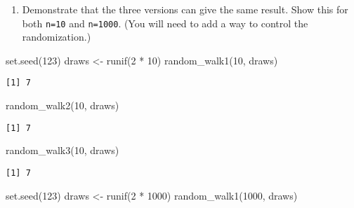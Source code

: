 \documentclass[
  letterpaper,
  DIV=11,
  numbers=noendperiod]{scrartcl}
\newenvironment{Shaded}{\begin{snugshade}}{\end{snugshade}}
\newcommand{\DecValTok}[1]{\textcolor[rgb]{0.68,0.00,0.00}{#1}}
\newcommand{\FunctionTok}[1]{\textcolor[rgb]{0.28,0.35,0.67}{#1}}
\newcommand{\NormalTok}[1]{\textcolor[rgb]{0.00,0.23,0.31}{#1}}
\newcommand{\OtherTok}[1]{\textcolor[rgb]{0.00,0.23,0.31}{#1}}
\newcommand{\SpecialCharTok}[1]{\textcolor[rgb]{0.37,0.37,0.37}{#1}}
\providecommand{\tightlist}{%
  \setlength{\itemsep}{0pt}\setlength{\parskip}{0pt}}
\begin{document}
\begin{enumerate}
\def\labelenumi{\arabic{enumi}.}
\setcounter{enumi}{1}
\tightlist
\item
  Demonstrate that the three versions can give the same result. Show
  this for both \texttt{n=10} and \texttt{n=1000}. (You will need to add
  a way to control the randomization.)\\
\end{enumerate}

\begin{Shaded}
\begin{Highlighting}[]
\FunctionTok{set.seed}\NormalTok{(}\DecValTok{123}\NormalTok{)}
\NormalTok{draws }\OtherTok{\textless{}{-}} \FunctionTok{runif}\NormalTok{(}\DecValTok{2} \SpecialCharTok{*} \DecValTok{10}\NormalTok{)}
\FunctionTok{random\_walk1}\NormalTok{(}\DecValTok{10}\NormalTok{, draws)}
\end{Highlighting}
\end{Shaded}

\begin{verbatim}
[1] 7
\end{verbatim}

\begin{Shaded}
\begin{Highlighting}[]
\FunctionTok{random\_walk2}\NormalTok{(}\DecValTok{10}\NormalTok{, draws)}
\end{Highlighting}
\end{Shaded}

\begin{verbatim}
[1] 7
\end{verbatim}

\begin{Shaded}
\begin{Highlighting}[]
\FunctionTok{random\_walk3}\NormalTok{(}\DecValTok{10}\NormalTok{, draws)}
\end{Highlighting}
\end{Shaded}

\begin{verbatim}
[1] 7
\end{verbatim}

\begin{Shaded}
\begin{Highlighting}[]
\FunctionTok{set.seed}\NormalTok{(}\DecValTok{123}\NormalTok{)}
\NormalTok{draws }\OtherTok{\textless{}{-}} \FunctionTok{runif}\NormalTok{(}\DecValTok{2} \SpecialCharTok{*} \DecValTok{1000}\NormalTok{)}
\FunctionTok{random\_walk1}\NormalTok{(}\DecValTok{1000}\NormalTok{, draws)}
\end{Highlighting}
\end{Shaded}
\end{document}
